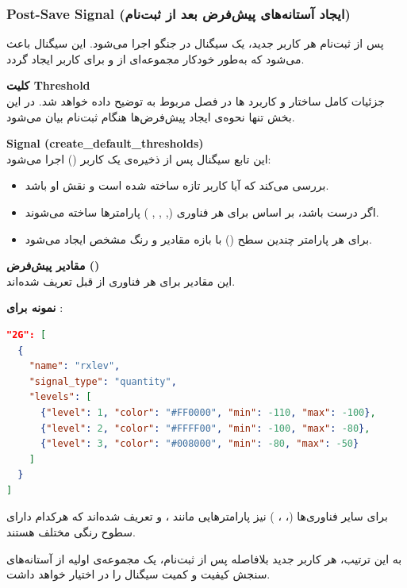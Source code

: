 \documentclass{report}
\begin{document}
\subsubsection{Post-Save Signal (ایجاد آستانه‌های پیش‌فرض بعد از ثبت‌نام)}

پس از ثبت‌نام هر کاربر جدید، یک سیگنال  در جنگو اجرا می‌شود. این سیگنال باعث می‌شود که به‌طور خودکار مجموعه‌ای از  و  برای کاربر ایجاد گردد.

\textbf{کلیت Threshold} \\
جزئیات کامل ساختار و کاربرد ها در فصل مربوط به  توضیح داده خواهد شد. 
در این بخش تنها نحوه‌ی ایجاد پیش‌فرض‌ها هنگام ثبت‌نام بیان می‌شود.

\textbf{Signal (create\_default\_thresholds)} \\
این تابع سیگنال پس از ذخیره‌ی یک کاربر () اجرا می‌شود:
\begin{itemize}
  \item بررسی می‌کند که آیا کاربر تازه ساخته شده است و نقش او  باشد.
  \item اگر درست باشد، بر اساس  برای هر فناوری (, , , ) پارامترها ساخته می‌شوند.
  \item برای هر پارامتر چندین سطح () با بازه مقادیر و رنگ مشخص ایجاد می‌شود.
\end{itemize}



\textbf{مقادیر پیش‌فرض ()} \\
این مقادیر برای هر فناوری از قبل تعریف شده‌اند.

\textbf{نمونه برای }:
\begin{lstlisting}[language=json]
"2G": [
  {
    "name": "rxlev",
    "signal_type": "quantity",
    "levels": [
      {"level": 1, "color": "#FF0000", "min": -110, "max": -100},
      {"level": 2, "color": "#FFFF00", "min": -100, "max": -80},
      {"level": 3, "color": "#008000", "min": -80, "max": -50}
    ]
  }
]
\end{lstlisting}

برای سایر فناوری‌ها (، ، ) نیز پارامترهایی مانند ،  و  تعریف شده‌اند که هرکدام دارای سطوح رنگی مختلف هستند. 

به این ترتیب، هر کاربر جدید بلافاصله پس از ثبت‌نام، یک مجموعه‌ی اولیه از آستانه‌های سنجش کیفیت و کمیت سیگنال را در اختیار خواهد داشت.
\end{document}
